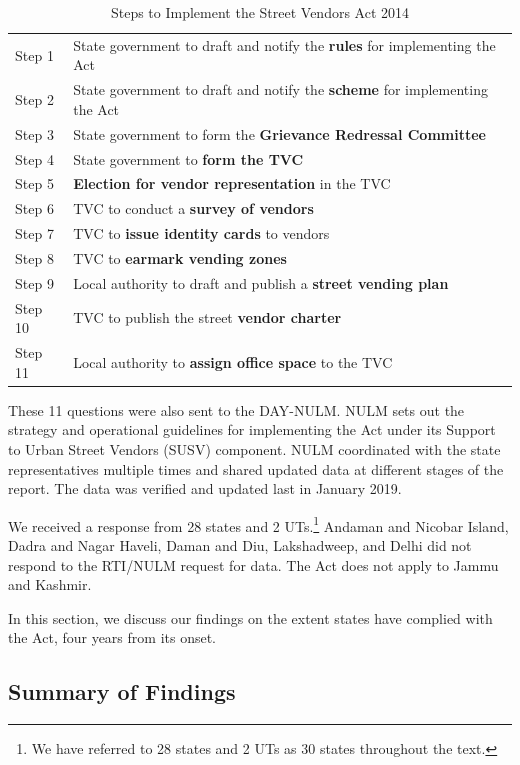 \documentclass[a4paper, 12pt, twoside]{article}
\begin{document}
{%
\begin{table}[htpb]
\caption{Steps to Implement the Street Vendors Act 2014}
\label{tab: SVACsteps}
\begin{tabular}{ l  l } %
\toprule
Step 1	&	State government to draft and notify the \textbf{rules} for implementing the Act\\
Step 2 	&	State government to draft and notify the \textbf{scheme} for implementing the Act\\
Step 3	&	State government to form the \textbf{Grievance Redressal Committee}\\
Step 4	&	State government to \textbf{form the TVC}\\
Step 5	&	\textbf{Election for vendor representation} in the TVC\\
Step 6	&	TVC to conduct a \textbf{survey of vendors}\\
Step 7	&	TVC to \textbf{issue identity cards} to vendors\\
Step 8	&	TVC to \textbf{earmark vending zones}\\
Step 9 	&	Local authority to draft and publish a \textbf{street vending plan}\\
Step 10	&	TVC to publish the street \textbf{vendor charter}\\
Step 11	&	Local authority to \textbf{assign office space} to the TVC\\
\bottomrule
\end{tabular}
\end{table} 

These 11 questions were also sent to the DAY-NULM. NULM sets out the strategy and operational guidelines for implementing the Act under its Support to Urban Street Vendors (SUSV) component. NULM coordinated with the state representatives multiple times and shared updated data at different stages of the report. The data was verified and updated last in January 2019.

	We received a response from 28 states and 2 UTs.\footnote{We have referred to 28 states and 2 UTs as 30 states throughout the text.} Andaman and Nicobar Island, Dadra and Nagar Haveli, Daman and Diu, Lakshadweep, and Delhi did not respond to the RTI/NULM request for data. The Act does not apply to Jammu and Kashmir. 

	In this section, we discuss our findings on the extent states have complied with the Act, four years from its onset.

\subsection*{Summary of Findings}

}
\end{document}
